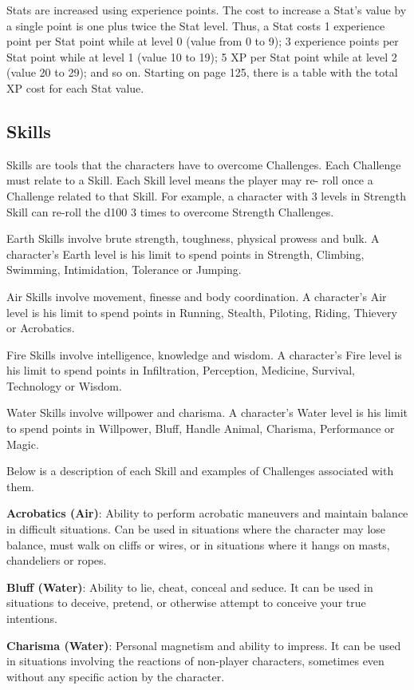 \begin{multicols}{2}
Stats are increased using experience
points. The cost to increase a Stat's value by a
single point is one plus twice the Stat level. Thus, a
Stat costs 1 experience point per Stat point while
at level 0 (value from 0 to 9); 3 experience points
per Stat point while at level 1 (value 10 to 19); 5
XP per Stat point while at level 2 (value 20 to 29);
and so on. Starting on page 125, there is a table
with the total XP cost for each Stat value.

\subsection{Skills}
Skills are tools that the characters have to
overcome Challenges. Each Challenge must relate
to a Skill. Each Skill level means the player may re-
roll once a Challenge related to that Skill. For
example, a character with 3 levels in Strength Skill
can re-roll the d100 3 times to overcome Strength
Challenges.

Earth Skills involve brute strength,
toughness, physical prowess and bulk. A
character's Earth level is his limit to spend
points in Strength, Climbing, Swimming,
Intimidation, Tolerance or Jumping.

Air Skills involve movement, finesse and
body coordination. A character's Air level is
his limit to spend points in Running, Stealth,
Piloting, Riding, Thievery or Acrobatics.

Fire Skills involve intelligence, knowledge
and wisdom. A character's Fire level is his
limit to spend points in Infiltration,
Perception, Medicine, Survival, Technology
or Wisdom.

Water Skills involve willpower and
charisma. A character's Water level is his
limit to spend points in Willpower, Bluff,
Handle Animal, Charisma, Performance or
Magic.

Below is a description of each Skill and
examples of Challenges associated with them.

\textbf{Acrobatics (Air)}: Ability to perform
acrobatic maneuvers and maintain balance in
difficult situations. Can be used in situations
where the character may lose balance, must walk
on cliffs or wires, or in situations where it hangs
on masts, chandeliers or ropes.

\textbf{Bluff (Water)}: Ability to lie, cheat, conceal
and seduce. It can be used in situations to deceive,
pretend, or otherwise attempt to conceive your
true intentions.

\textbf{Charisma (Water)}: Personal magnetism
and ability to impress. It can be used in situations
involving the reactions of non-player characters,
sometimes even without any specific action by the
character.


\end{multicols}
